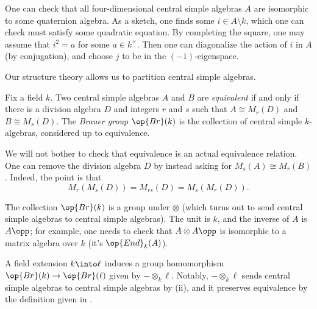\documentclass[../notes.tex]{subfiles}
\begin{document}
\begin{remark}
	One can check that all four-dimensional central simple algebras $A$ are isomorphic to some quaternion algebra. As a sketch, one finds some $i\in A\setminus k$, which one can check must satisfy some quadratic equation. By completing the square, one may assume that $i^2=a$ for some $a\in k^\times$. Then one can diagonalize the action of $i$ in $A$ (by conjugation), and choose $j$ to be in the $(-1)$-eigenspace.
\end{remark}
Our structure theory allows us to partition central simple algebras.
\begin{definition}
	Fix a field $k$. Two central simple algebras $A$ and $B$ are \textit{equivalent} if and only if there is a division algebra $D$ and integers $r$ and $s$ such that $A\cong M_r(D)$ and $B\cong M_s(D)$. The \textit{Brauer group} $\op{Br}(k)$ is the collection of central simple $k$-algebras, considered up to equivalence.
\end{definition}
\begin{remark} \label{rem:better-equiv}
	We will not bother to check that equivalence is an actual equivalence relation. One can remove the division algebra $D$ by instead asking for $M_s(A)\cong M_r(B)$. Indeed, the point is that
	\[M_r(M_s(D))=M_{rs}(D)=M_s(M_r(D)).\]
\end{remark}
\begin{remark} \label{rem:br-is-group}
	The collection $\op{Br}(k)$ is a group under $\otimes$ (which turns out to send central simple algebras to central simple algebras). The unit is $k$, and the inverse of $A$ is $A\opp$; for example, one needs to check that $A\otimes A\opp$ is isomorphic to a matrix algebra over $k$ (it's $\op{End}_k(A)$).
\end{remark}
\begin{remark}
	A field extension $k\into\ell$ induces a group homomorphism $\op{Br}(k)\to\op{Br}(\ell)$ given by $-\otimes_k\ell$. Notably, $-\otimes_k\ell$ sends central simple algebras to central simple algebras by (ii), and it preserves equivalence by the definition given in .
\end{remark}
\end{document}
